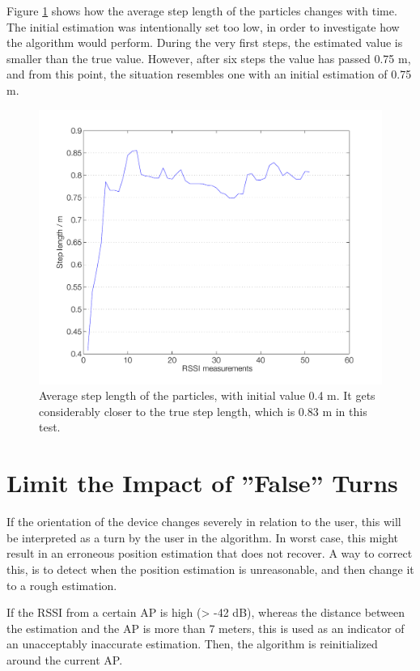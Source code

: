 \documentclass{LTHthesis}
\begin{document}
Figure \ref{step_length} shows how the average step length of the particles changes with time. The initial estimation was intentionally set too low, in order to investigate how the algorithm would perform. During the very first steps, the estimated value is smaller than the true value. However, after six steps the value has passed 0.75 m, and from this point, the situation resembles one with an initial estimation of 0.75 m. 
%
\begin{figure}[!hbt]

\includegraphics[width=1\textwidth ]{images/sensor_fused/step_length}
\caption{Average step length of the particles, with initial value 0.4 m. It gets considerably closer to the true step length, which is 0.83 m in this test.}\label{step_length}
\end{figure}
%
\section{Limit the Impact of ''False'' Turns}
%
If the orientation of the device changes severely in relation to the user, this will be interpreted as a turn by the user in the algorithm. In worst case, this might result in an erroneous position estimation that does not recover. A way to correct this, is to detect when the position estimation is unreasonable, and then change it to a rough estimation.

If the RSSI from a certain AP is high (> -42 dB), whereas the distance between the estimation and the AP is more than 7 meters, this is used as an indicator of an unacceptably inaccurate estimation. Then, the algorithm is reinitialized around the current AP.
\end{document}
